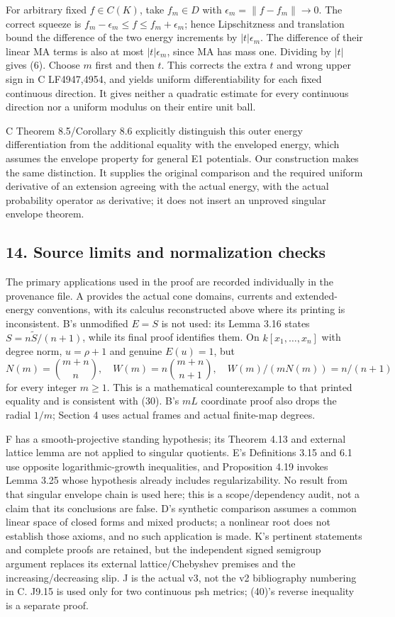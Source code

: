 \documentclass[
  10pt,
]{article}
\begin{document}
For arbitrary fixed \(f\in C(K)\), take \(f_m\in D\) with
\(\epsilon_m=\|f-f_m\|\to0\). The correct squeeze is
\(f_m-\epsilon_m\leq f\leq f_m+\epsilon_m\); hence Lipschitzness and
translation bound the difference of the two energy increments by
\(|t|\epsilon_m\). The difference of their linear MA terms is also at
most \(|t|\epsilon_m\), since MA has mass one. Dividing by \(|t|\) gives
(6). Choose \(m\) first and then \(t\). This corrects the extra \(t\)
and wrong upper sign in C LF4947,4954, and yields uniform
differentiability for each fixed continuous direction. It gives neither
a quadratic estimate for every continuous direction nor a uniform
modulus on their entire unit ball.

C Theorem 8.5/Corollary 8.6 explicitly distinguish this outer energy
differentiation from the additional equality with the enveloped energy,
which assumes the envelope property for general E1 potentials. Our
construction makes the same distinction. It supplies the original
comparison and the required uniform derivative of an extension agreeing
with the actual energy, with the actual probability operator as
derivative; it does not insert an unproved singular envelope theorem.

\subsection{14. Source limits and normalization
checks}\label{source-limits-and-normalization-checks}

The primary applications used in the proof are recorded individually in
the provenance file. A provides the actual cone domains, currents and
extended-energy conventions, with its calculus reconstructed above where
its printing is inconsistent. B's unmodified \(E=S\) is not used: its
Lemma 3.16 states \(S=n\widetilde S/(n+1)\), while its final proof
identifies them. On \(k[x_1,\ldots,x_n]\) with degree norm, \(u=\rho+1\)
and genuine \(E(u)=1\), but
\[ N(m)=\binom{m+n}{n},\quad W(m)=n\binom{m+n}{n+1},\quad W(m)/(mN(m))=n/(n+1) \]
for every integer \(m\geq1\). This is a mathematical counterexample to
that printed equality and is consistent with (30). B's \(mL\) coordinate
proof also drops the radial \(1/m\); Section 4 uses actual frames and
actual finite-map degrees.

F has a smooth-projective standing hypothesis; its Theorem 4.13 and
external lattice lemma are not applied to singular quotients. E's
Definitions 3.15 and 6.1 use opposite logarithmic-growth inequalities,
and Proposition 4.19 invokes Lemma 3.25 whose hypothesis already
includes regularizability. No result from that singular envelope chain
is used here; this is a scope/dependency audit, not a claim that its
conclusions are false. D's synthetic comparison assumes a common linear
space of closed forms and mixed products; a nonlinear root does not
establish those axioms, and no such application is made. K's pertinent
statements and complete proofs are retained, but the independent signed
semigroup argument replaces its external lattice/Chebyshev premises and
the increasing/decreasing slip. J is the actual v3, not the v2
bibliography numbering in C. J9.15 is used only for two continuous psh
metrics; (40)'s reverse inequality is a separate proof.
\end{document}
